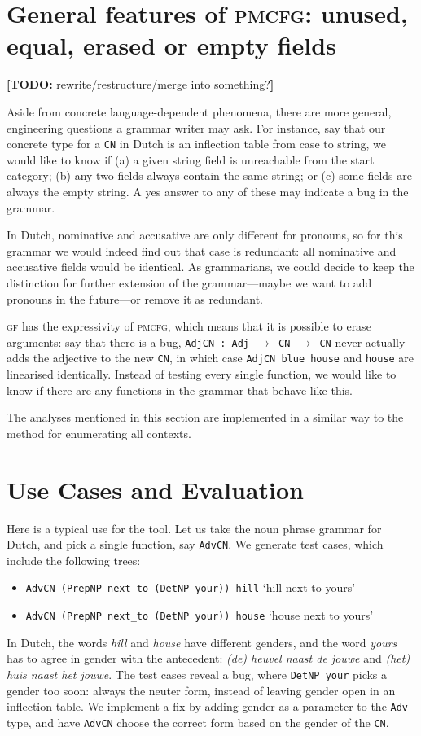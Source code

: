 \documentclass[11pt]{article}
\def\t#1{\texttt{#1}}
\def\gf{\textsc{gf}}
\def\pmcfg{\textsc{pmcfg}}
\newcommand{\todo}[1]{{\color{cyan}\textbf{[TODO: }#1\textbf{]}}}
\begin{document}
\section{General features of \pmcfg: unused, equal,
  erased or empty fields}

\todo{rewrite/restructure/merge into something?}

Aside from concrete language-dependent phenomena, there are more
general, engineering questions a grammar writer may ask. For instance, say that our
concrete type for a \t{CN} in Dutch is an inflection table from case
to string, we would like to know if (a) a given string field is unreachable from the start category; (b) any two fields always contain the same string; or (c) some fields
are always the empty string. A yes answer to any of these may indicate a bug in the grammar.

In Dutch, nominative and accusative are only different for
pronouns, so for this grammar we would indeed find out that case is
redundant: all nominative and accusative fields would be
identical. As grammarians, we could decide to keep the distinction for
further extension of the grammar---maybe we want to add pronouns in
the future---or remove it as redundant.

\gf{} has the expressivity of \pmcfg{}, which means that it is
possible to erase arguments: say that there is a bug, \t{AdjCN : Adj
  $\rightarrow$ CN  $\rightarrow$ CN} never actually adds the
adjective to the new \t{CN}, in which case \t{AdjCN blue house} and
\t{house} are linearised identically. Instead of testing every single
function, we would like to know if there are any functions in the
grammar that behave like this.

The analyses mentioned in this section are implemented in a similar way to the method for enumerating all contexts.

\section{Use Cases and Evaluation}

Here is a typical use for the tool. 
Let us take the noun phrase grammar for Dutch, and pick a single function,
say \t{AdvCN}. We generate test cases, which include the following
trees: 
\begin{itemize}
\item \t{AdvCN (PrepNP next\_to (DetNP your)) hill} `hill next to
yours'
\item \t{AdvCN (PrepNP next\_to (DetNP your)) house} `house next
to yours'
\end{itemize}
In Dutch, the words \emph{hill} and \emph{house} have different
genders, and the word \emph{yours} has to agree in gender 
with the antecedent: \emph{(de) heuvel naast de jouwe} and \emph{(het)
  huis naast het jouwe}. The test cases reveal a bug, where \t{DetNP your} 
picks a gender too soon: always the neuter form, instead of leaving
gender open in an inflection table. We implement a fix by adding
gender as a parameter to the \t{Adv} type, and have \t{AdvCN} choose
the correct form based on the gender of the \t{CN}. 
\end{document}

